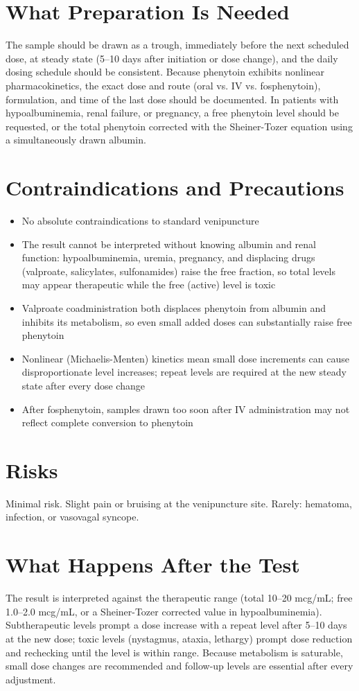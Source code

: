 \section*{What Preparation Is Needed}
The sample should be drawn as a trough, immediately before the next scheduled dose, at steady state (5--10 days after initiation or dose change), and the daily dosing schedule should be consistent. Because phenytoin exhibits nonlinear pharmacokinetics, the exact dose and route (oral vs. IV vs. fosphenytoin), formulation, and time of the last dose should be documented. In patients with hypoalbuminemia, renal failure, or pregnancy, a free phenytoin level should be requested, or the total phenytoin corrected with the Sheiner-Tozer equation using a simultaneously drawn albumin.

\section*{Contraindications and Precautions}
\begin{itemize}
  \item No absolute contraindications to standard venipuncture
  \item The result cannot be interpreted without knowing albumin and renal function: hypoalbuminemia, uremia, pregnancy, and displacing drugs (valproate, salicylates, sulfonamides) raise the free fraction, so total levels may appear therapeutic while the free (active) level is toxic
  \item Valproate coadministration both displaces phenytoin from albumin and inhibits its metabolism, so even small added doses can substantially raise free phenytoin
  \item Nonlinear (Michaelis-Menten) kinetics mean small dose increments can cause disproportionate level increases; repeat levels are required at the new steady state after every dose change
  \item After fosphenytoin, samples drawn too soon after IV administration may not reflect complete conversion to phenytoin
\end{itemize}

\section*{Risks}
Minimal risk. Slight pain or bruising at the venipuncture site. Rarely: hematoma, infection, or vasovagal syncope.

\section*{What Happens After the Test}
The result is interpreted against the therapeutic range (total 10--20 mcg/mL; free 1.0--2.0 mcg/mL, or a Sheiner-Tozer corrected value in hypoalbuminemia). Subtherapeutic levels prompt a dose increase with a repeat level after 5--10 days at the new dose; toxic levels (nystagmus, ataxia, lethargy) prompt dose reduction and rechecking until the level is within range. Because metabolism is saturable, small dose changes are recommended and follow-up levels are essential after every adjustment.

